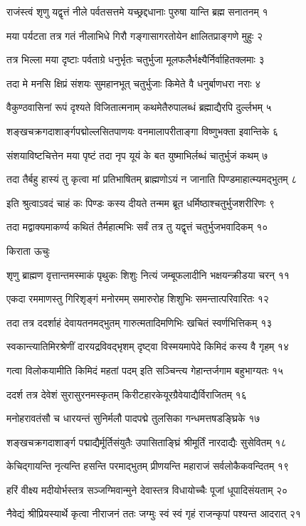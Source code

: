 राजंस्त्वं शृणु यद्वृत्तं नीले पर्वतसत्तमे
यच्छ्रद्दधानाः पुरुषा यान्ति ब्रह्म सनातनम् १

मया पर्यटता तत्र गतं नीलाभिधे गिरौ
गङ्गासागरतोयेन क्षालितप्राङ्गणे मुहुः २

तत्र भिल्ला मया दृष्टाः पर्वताग्रे धनुर्भृतः
चतुर्भुजा मूलफलैर्भक्ष्यैर्निर्वाहितक्लमाः ३

तदा मे मनसि क्षिप्रं संशयः सुमहानभूत्
चतुर्भुजाः किमेते वै धनुर्बाणधरा नराः ४

वैकुण्ठवासिनां रूपं दृश्यते विजितात्मनाम्
कथमेतैरुपालब्धं ब्रह्माद्यैरपि दुर्ल्लभम् ५

शङ्खचक्रगदाशार्ङ्गपद्मोल्लसितपाणयः
वनमालापरीताङ्गा विष्णुभक्ता इवान्तिके ६

संशयाविष्टचित्तेन मया पृष्टं तदा नृप
यूयं के बत युष्माभिर्लब्धं चातुर्भुजं कथम् ७

तदा तैर्बहु हास्यं तु कृत्वा मां प्रतिभाषितम्
ब्राह्मणोऽयं न जानाति पिण्डमाहात्म्यमद्भुतम् ८

इति श्रुत्वाऽवदं चाहं कः पिण्डः कस्य दीयते
तन्मम ब्रूत धर्मिष्ठाश्चतुर्भुजशरीरिणः ९

तदा मद्वाक्यमाकर्ण्य कथितं तैर्महात्मभिः
सर्वं तत्र तु यद्वृत्तं चतुर्भुजभवादिकम् १०

किराता ऊचुः

शृणु ब्राह्मण वृत्तान्तमस्माकं पृथुकः शिशुः
नित्यं जम्बूफलादीनि भक्षयन्क्रीडया चरन् ११

एकदा रममाणस्तु गिरिशृङ्गं मनोरमम्
समारुरोह शिशुभिः समन्तात्परिवारितः १२

तदा तत्र ददर्शाहं देवायतनमद्भुतम्
गारुत्मतादिमणिभिः खचितं स्वर्णभित्तिकम् १३

स्वकान्त्यातिमिरश्रेणीं दारयद्रविवद्भृशम्
दृष्ट्वा विस्मयमापेदे किमिदं कस्य वै गृहम् १४

गत्वा विलोकयामीति किमिदं महतां पदम्
इति सञ्चिन्त्य गेहान्तर्जगाम बहुभाग्यतः १५

ददर्श तत्र देवेशं सुरासुरनमस्कृतम्
किरीटहारकेयूरग्रैवेयाद्यैर्विराजितम् १६

मनोहरावतंसौ च धारयन्तं सुनिर्मलौ
पादपद्मे तुलसिका गन्धमत्तषडङ्घ्रिके १७

शङ्खचक्रगदाशार्ङ्ग पद्माद्यैर्मूर्तिसंयुतैः
उपासिताङ्घ्रिं श्रीमूर्तिं नारदाद्यैः सुसेवितम् १८

केचिद्गायन्ति नृत्यन्ति हसन्ति परमाद्भुतम्
प्रीणयन्ति महाराजं सर्वलोकैकवन्दितम् १९

हरिं वीक्ष्य मदीयोर्भस्तत्र सञ्जग्मिवान्मुने
देवास्तत्र विधायोच्चैः पूजां धूपादिसंयताम् २०

नैवेद्यं श्रीप्रियस्यार्थे कृत्वा नीराजनं ततः
जग्मुः स्वं स्वं गृहं राजन्कृपां पश्यन्त आदरात् २१


